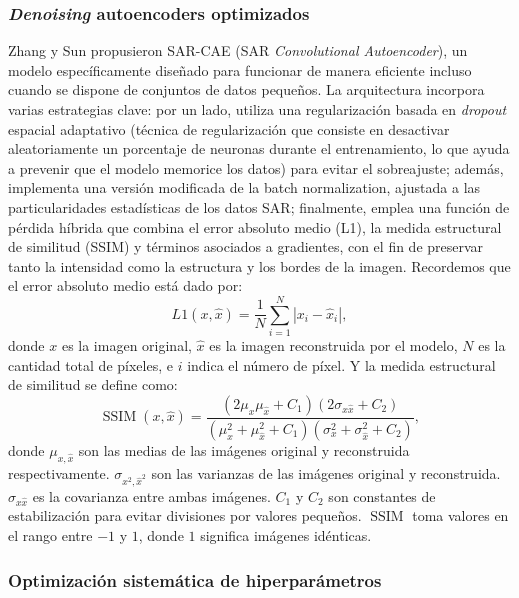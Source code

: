 \subsubsection{\emph{Denoising} autoencoders optimizados}

Zhang y Sun \cite{zhang2020autoencoder} propusieron SAR-CAE (SAR \emph{Convolutional Autoencoder}), un modelo específicamente diseñado para funcionar de manera eficiente incluso cuando se dispone de conjuntos de datos pequeños. La arquitectura incorpora varias estrategias clave: por un lado, utiliza una regularización basada en \emph{dropout} espacial adaptativo (técnica de regularización que consiste en desactivar aleatoriamente un porcentaje de neuronas durante el entrenamiento, lo que ayuda a prevenir que el modelo memorice los datos) para evitar el sobreajuste; además, implementa una versión modificada de la batch normalization, ajustada a las particularidades estadísticas de los datos SAR; finalmente, emplea una función de pérdida híbrida que combina el error absoluto medio (L1), la medida estructural de similitud (SSIM) y términos asociados a gradientes, con el fin de preservar tanto la intensidad como la estructura y los bordes de la imagen. Recordemos que el error absoluto medio está dado por:
\begin{equation}
	L1(x, \hat{x}) = \frac{1}{N} \sum_{i=1}^{N} \left| x_i - \hat{x}_i \right|,
\end{equation}
donde $x$ es la imagen original, $\hat{x}$ es la imagen reconstruida por el modelo, $N$ es la cantidad total de píxeles, e $i$ indica el número de píxel. Y la medida estructural de similitud se define como:
\begin{equation}
	\operatorname{SSIM}(x, \hat{x}) =
	\frac{(2\mu_x \mu_{\hat{x}} + C_1)(2\sigma_{x\hat{x}} + C_2)}
	{(\mu_x^2 + \mu_{\hat{x}}^2 + C_1)(\sigma_x^2 + \sigma_{\hat{x}}^2 + C_2)},
\end{equation}
donde $\mu_{x,\hat{x}}$ son las medias de las imágenes original y reconstruida respectivamente. $\sigma_{x^2,{\hat{x}}^2}$ son las varianzas de las imágenes original y reconstruida. $\sigma_{x\hat{x}}$ es la covarianza entre ambas imágenes. $C_1$ y $C_2$ son constantes de estabilización para evitar divisiones por valores pequeños. $\operatorname{SSIM}$ toma valores en el rango entre $-1$ y $1$, donde $1$ significa imágenes idénticas.

\subsubsection{Optimización sistemática de hiperparámetros}

